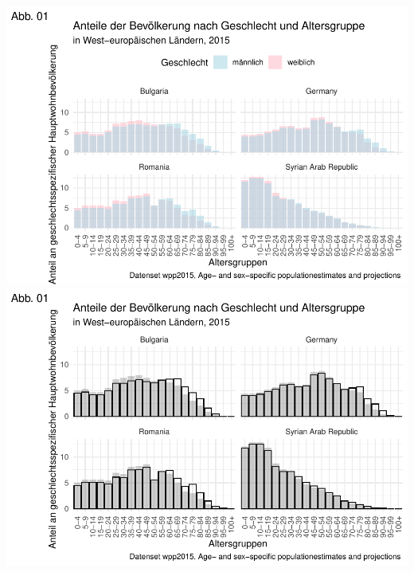 \documentclass[
]{article}
\begin{document}
\includegraphics{ggplot2_files/figure-latex/unnamed-chunk-13-1.pdf}
\includegraphics{ggplot2_files/figure-latex/unnamed-chunk-14-1.pdf}
\end{document}
